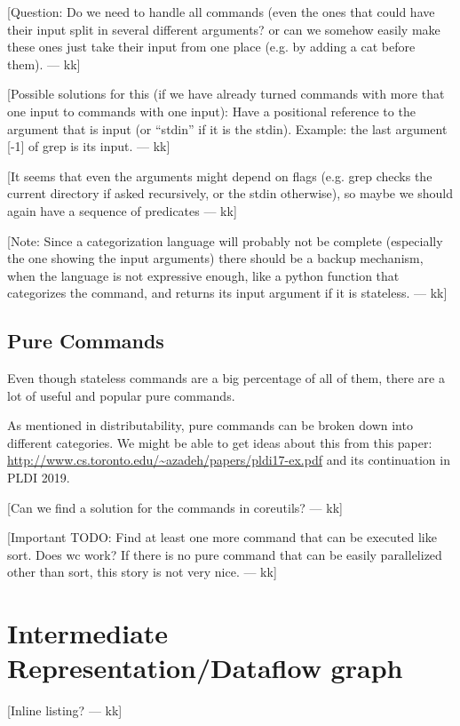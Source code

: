 \documentclass[sigplan,10pt,review,anonymous]{acmart}
\newcommand{\kk}[1]{[{\color{magenta}#1 --- kk}]}
\begin{document}
\kk{Question: Do we need to handle all commands (even the ones that
  could have their input split in several different arguments? or can
  we somehow easily make these ones just take their input from one
  place (e.g. by adding a cat before them).}

\kk{Possible solutions for this (if we have already turned commands
  with more that one input to commands with one input): Have a
  positional reference to the argument that is input (or ``stdin'' if
  it is the stdin). Example: the last argument [-1] of grep is its
  input.}

\kk{It seems that even the arguments might depend on flags (e.g. grep
  checks the current directory if asked recursively, or the stdin
  otherwise), so maybe we should again have a sequence of predicates}


\kk{Note: Since a categorization language will probably not be
  complete (especially the one showing the input arguments) there
  should be a backup mechanism, when the language is not expressive
  enough, like a python function that categorizes the command, and
  returns its input argument if it is stateless.}

\subsection{Pure Commands}

Even though stateless commands are a big percentage of all of them,
there are a lot of useful and popular pure commands.

As mentioned in distributability, pure commands can be broken down
into different categories. We might be able to get ideas about this
from this paper:
\url{http://www.cs.toronto.edu/~azadeh/papers/pldi17-ex.pdf} and its
continuation in PLDI 2019.

\kk{Can we find a solution for the commands in coreutils?}

\kk{Important TODO: Find at least one more command that can be
  executed like sort. Does wc work? If there is no pure command that
  can be easily parallelized other than sort, this story is not very
  nice.}



\section{Intermediate Representation/Dataflow graph}
\label{ir}

\kk{Inline listing?}
\end{document}
